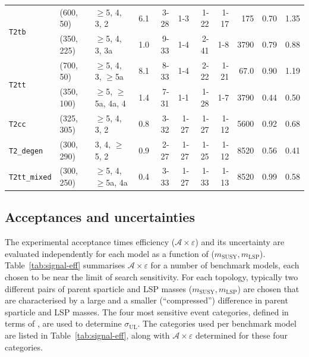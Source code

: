 \begin{table}[tb]
\begin{tabular}{ lllcrrrrrcc }
    \multirow{2}{*}{\texttt{T2tb}}
  & (600, 50)   & $\geq$5, 4, 3, 2         & \phantom{1}6.1 & 3-28  & 1-3   & 1-22  & 1-17 & 175  & 0.70 & 1.35 \\
  & (350, 225)  & $\geq$5, 4, 3, 3a        & \phantom{1}1.0 & 9-33  & 1-4   & 2-41  & 1-8  & 3790 & 0.79 & 0.88 \\ [0.5ex]
    \multirow{2}{*}{\texttt{T2tt}}
  & (700, 50)   & $\geq$5, 4, 3, $\geq$5a  & \phantom{1}8.1 & 8-33  & 1-4   & 2-22  & 1-21 & 67.0 & 0.90 & 1.19 \\
  & (350, 100)  & $\geq$5, $\geq$5a, 4a, 4 & \phantom{1}1.4 & 7-31  & 1-1   & 1-28  & 1-7  & 3790 & 0.44 & 0.50 \\ [0.5ex]
    \multirow{1}{*}{\texttt{T2cc}}
  & (325, 305)  & $\geq$5, 4, 3, 2         & \phantom{1}0.8 & 3-32  & 1-27  & 1-27  & 1-12 & 5600 & 0.92 & 0.68 \\ [0.5ex]
    \multirow{1}{*}{\texttt{T2\_degen}}
  & (300, 290)  & 3, 4, $\geq$5, 2         & \phantom{1}0.9 & 2-27  & 1-27  & 1-25  & 1-12 & 8520 & 0.56 & 0.41 \\ [0.5ex]
    \multirow{1}{*}{\texttt{T2tt\_mixed}}
  & (300, 250)  & $\geq$5, 4, $\geq$5a, 4a & \phantom{1}0.4 & 3-33  & 1-27  & 1-33  & 1-13 & 8520 & 0.99 & 0.58 \\ [0.5ex]
    \hline
  \end{tabular}
\end{table}

\subsection{Acceptances and uncertainties}

The experimental acceptance times efficiency
($\mathcal{A}\times\varepsilon$) and its uncertainty are evaluated
independently for each model as a function of ($m_\text{SUSY},
m_\text{LSP}$). Table~\ref{tab:signal-eff} summarises
$\mathcal{A}\times\varepsilon$ for a number of benchmark models, each
chosen to be near the limit of search sensitivity. For each topology,
typically two different pairs of parent sparticle and LSP masses
($m_\text{SUSY}, m_\text{LSP}$) are chosen that are characterised by a
large and a smaller (\ie ``compressed'') difference in parent
sparticle and LSP masses. The four most sensitive event categories,
defined in terms of \njet, are used to determine
$\sigma_\text{UL}$. The categories used per benchmark model are listed
in Table~\ref{tab:signal-eff}, along with
$\mathcal{A}\times\varepsilon$ determined for these four categories.

